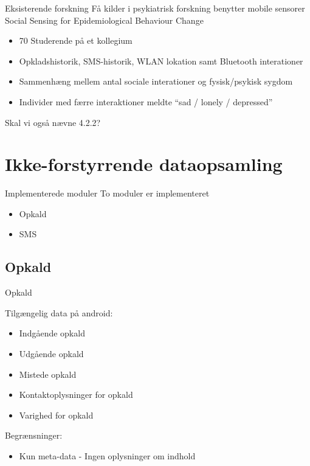 {\aauwavesbg%
	\begin{frame}{Eksisterende forskning} %
		Få kilder i psykiatrisk forskning benytter mobile sensorer
		Social Sensing for Epidemiological Behaviour Change
		\begin{itemize}
			\item 70 Studerende på et kollegium
			\item Opkladshistorik, SMS-historik, WLAN lokation samt Bluetooth interationer
			\item Sammenhæng mellem antal sociale interationer og fysisk/psykisk sygdom
			\item Individer med færre interaktioner meldte ``sad / lonely / depressed''
		\end{itemize}
		
{\color{red} Skal vi også nævne 4.2.2?}
		
	\end{frame}}

\section{Ikke-forstyrrende dataopsamling}
{\aauwavesbg%
	\begin{frame}{Implementerede moduler} %
		To moduler er implementeret
		\begin{itemize}
			\item Opkald
			\item SMS
		\end{itemize}
			
	\end{frame}}

\subsection{Opkald}
{\aauwavesbg%
\begin{frame}{Opkald} %
	
Tilgængelig data på android:
\begin{itemize}
	\item Indgående opkald
	\item Udgående opkald
	\item Mistede opkald
	\item Kontaktoplysninger for opkald
	\item Varighed for opkald
\end{itemize}

Begrænsninger:
\begin{itemize}
	\item Kun meta-data - Ingen oplysninger om indhold
\end{itemize}

\end{frame}}

